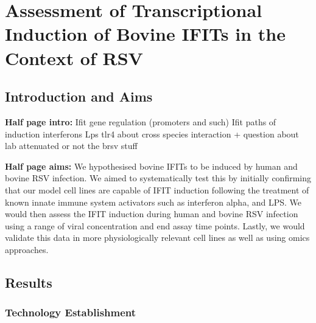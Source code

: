 \chapter{Assessment of Transcriptional Induction of Bovine IFITs in the Context of RSV} \label{ch:Assessment of Transcriptional Induction of Bovine IFITs in the Context of RSV}
\section{Introduction and Aims} \label{sec:Introduction and Aims Chapter2}
\textbf{Half page intro:}
Ifit gene regulation (promoters and such) \newline
Ifit paths of induction \newline
interferons \newline
Lps tlr4 \newline
about cross species interaction + question about lab attenuated or not the brsv stuff

\lipsum[1-2]

\textbf{Half page aims:}
We hypothesised  bovine IFITs to be induced by human and bovine RSV infection. We aimed to systematically test this by initially confirming that our model cell lines are capable of IFIT induction following the treatment of known innate immune system activators such as interferon alpha, and LPS. We would then assess the IFIT induction during human and bovine RSV infection using a range of viral concentration and end assay time points. Lastly, we would validate this data in more physiologically relevant cell lines as well as using omics approaches.

\lipsum[1]

\section{Results} \label{sec:Results Chapter2}
\subsection{Technology Establishment} \label{subsec:Technology Establishment}
